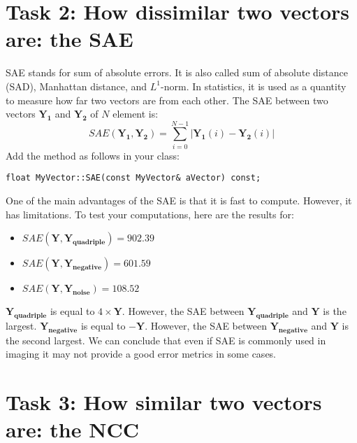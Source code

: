 \documentclass[english,a4paper,12pt,oneside]{article}
\begin{document}
\section*{Task 2: How dissimilar two vectors are: the SAE}

SAE stands for sum of absolute errors. It is also called sum of absolute distance (SAD), Manhattan distance, and $L^1$-norm.  
In statistics, it is used as a quantity to measure how far two vectors are from each other. 
The SAE between two vectors $\mathbf{Y_1}$ and $\mathbf{Y_2}$ of $N$ element is:
\begin{equation}
SAE(\mathbf{Y_1}, \mathbf{Y_2}) = \sum^{N-1}_{i=0} |\mathbf{Y_1}(i)-\mathbf{Y_2}(i)|
\end{equation}
Add the method as follows in your class:
\begin{lstlisting}
float MyVector::SAE(const MyVector& aVector) const;
\end{lstlisting}

One of the main advantages of the SAE is that it is fast to compute.  
However, it has limitations. 
To test your computations, here are the results for:
\begin{itemize}
\item $SAE(\mathbf{Y}, \mathbf{Y_{quadriple}}) =  902.39$
\item $SAE(\mathbf{Y}, \mathbf{Y_{negative}}) =  601.59$
\item $SAE(\mathbf{Y}, \mathbf{Y_{noise}}) =  108.52$
\end{itemize}
$\mathbf{Y_{quadriple}}$ is equal to $4 \times \mathbf{Y}$. 
However, the SAE between $\mathbf{Y_{quadriple}}$ and $\mathbf{Y}$ is the largest. 
$\mathbf{Y_{negative}}$ is equal to $\mathbf{-Y}$. 
However, the SAE between $\mathbf{Y_{negative}}$ and $\mathbf{Y}$ is the second largest. 
We can conclude that even if SAE is commonly used in imaging  it may not provide a good error metrics in some cases.

\section*{Task 3: How similar two vectors are: the NCC}
\end{document}
